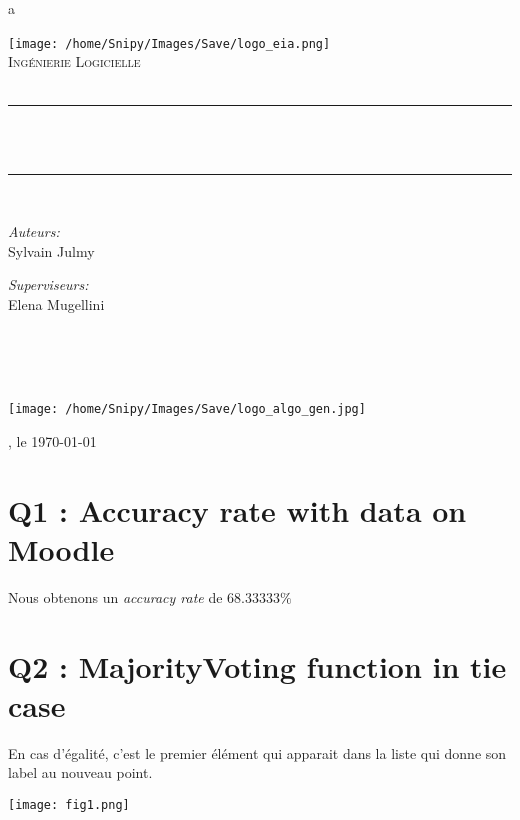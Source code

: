 a \documentclass[a4paper,11pt]{report}
\newcommand{\Ecole}{}
\newcommand{\Filiere}{Ingénierie Logicielle}
\newcommand{\Cours}{}
\newcommand{\Titre}{}
\newcommand{\Lieu}{}
\newcommand{\ReferentA}{Elena Mugellini}
\newcommand{\PartA}{Sylvain Julmy}
\newcommand{\PartB}{}
\newcommand{\Parts}{\PartA \\ \PartB}
\newcommand{\Referents}{\ReferentA \\ \ReferentB \\ \ReferentC \\ \ReferentD}
\newcommand{\HRule}{\rule{\linewidth}{0.5mm}}
\begin{document}
\begin{titlepage}
    \begin{center}

        \texttt{[image: /home/Snipy/Images/Save/logo\_eia.png]}~\\[1cm]
        \textsc{\LARGE \Ecole}
        \textsc{\Large \Filiere}\\[1.5cm]
        \textsc{\Large \Cours}\\[0.5cm]

        \HRule \\[0.4cm]
        { \huge \bfseries \Titre\\[0.4cm] }
        \HRule \\[1.5cm]

        \begin{minipage}[t]{0.4\textwidth}
            \begin{flushleft} \large
                \emph{Auteurs:}\\ \Parts
            \end{flushleft}
        \end{minipage}
        \begin{minipage}[t]{0.4\textwidth}
            \begin{flushright} \large
                \emph{Superviseurs:}\\\Referents
            \end{flushright}
        \end{minipage}~\\[1.5cm]

        \begin{center}
            \texttt{[image: /home/Snipy/Images/Save/logo\_algo\_gen.jpg]}
        \end{center}

        \vfill

        {\large \Lieu, le \today}

    \end{center}
\end{titlepage}

\section*{Q1 : Accuracy rate with data on Moodle}
Nous obtenons un \textit{accuracy rate} de $68.33333\%$

\section*{Q2 : MajorityVoting function in tie case}
En cas d'égalité, c'est le premier élément qui apparait dans la liste qui donne son label au nouveau point.
\begin{center}
    \texttt{[image: fig1.png]}
\end{center}
\end{document}
